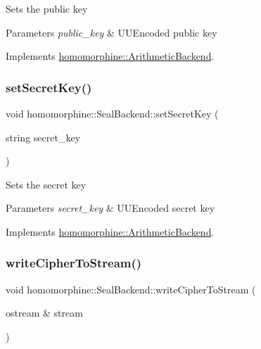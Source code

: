 Sets the public key


\begin{DoxyParams}{Parameters}
{\em public\+\_\+key} & U\+U\+Encoded public key \\
\hline
\end{DoxyParams}


Implements \mbox{\hyperlink{classhomomorphine_1_1_arithmetic_backend_af2dd2c37ed1fcd56b58baa6cb3f14e8b}{homomorphine\+::\+Arithmetic\+Backend}}.

\mbox{\label{classhomomorphine_1_1_seal_backend_aa9fd3331b2c710e8fdfc3385bbf11eb5}} 
\subsubsection{\texorpdfstring{setSecretKey()}{setSecretKey()}}
{\footnotesize\ttfamily void homomorphine\+::\+Seal\+Backend\+::set\+Secret\+Key (\begin{DoxyParamCaption}\item[{string}]{secret\+\_\+key }\end{DoxyParamCaption})\hspace{0.3cm}{\ttfamily [virtual]}}

Sets the secret key


\begin{DoxyParams}{Parameters}
{\em secret\+\_\+key} & U\+U\+Encoded secret key \\
\hline
\end{DoxyParams}


Implements \mbox{\hyperlink{classhomomorphine_1_1_arithmetic_backend_a0bb3c2728df4662c6472d4d43215410f}{homomorphine\+::\+Arithmetic\+Backend}}.

\mbox{\label{classhomomorphine_1_1_seal_backend_a2d30b67d872ccd9dc572da2bb08b0635}} 
\subsubsection{\texorpdfstring{writeCipherToStream()}{writeCipherToStream()}}
{\footnotesize\ttfamily void homomorphine\+::\+Seal\+Backend\+::write\+Cipher\+To\+Stream (\begin{DoxyParamCaption}\item[{ostream \&}]{stream }\end{DoxyParamCaption})\hspace{0.3cm}{\ttfamily [virtual]}}

